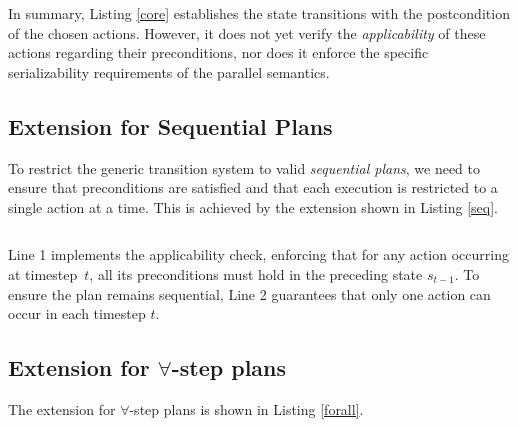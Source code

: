 \documentclass[
     11pt,                    %
     a4paper,             %
     BCOR=10mm,     %
     DIV=14,                 %
     listof=totoc,                    %
     bibliography=totoc,       %
     index=totoc,              %
     parskip            %
     twoside,
     headsepline
     ]{scrreprt}
\theoremstyle{definition}
\theoremstyle{definition}
\theoremstyle{remark}
\theoremstyle{bfnote}
\begin{document}
In summary, Listing \ref{core} establishes the state transitions with the postcondition of the chosen actions. 
However, it does not yet verify the \textit{applicability} of these actions regarding their preconditions, nor does it enforce the specific serializability requirements of the parallel semantics. 

\subsection{Extension for Sequential Plans}

To restrict the generic transition system to valid \textit{sequential plans}, we need to ensure that preconditions are satisfied and that each execution is restricted to a single action at a time.
This is achieved by the extension shown in Listing \ref{seq}.

\begin{listing}[H]
  \caption{Extension of Listing \ref{core} for Encoding Sequential Plans}
  \inputminted[frame=single,framesep=2mm,baselinestretch=1.2,linenos, firstline=2, firstnumber=1]{prolog}{encodings/EX_seq.lp}
  \label{seq}
\end{listing}

Line 1 implements the applicability check, enforcing that for any action occurring at timestep~$t$, all its preconditions must hold in the preceding state $s_{t-1}$. To ensure the plan remains sequential, Line 2 guarantees that only one action can occur in each timestep $t$.

\subsection{Extension for \texorpdfstring{$\boldsymbol{\forall}$}{forall}-step plans}

The extension for $\forall$-step plans is shown in Listing \ref{forall}.

\begin{listing}[H]
  \caption{Extension of Listing \ref{core} for Encoding $\forall$-step Plans}
  \inputminted[frame=single,framesep=2mm,baselinestretch=1.2,linenos, firstline=2, firstnumber=1]{prolog}{encodings/EX_forall.lp}
  \label{forall}
\end{listing}
\end{document}
